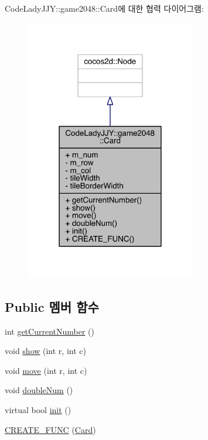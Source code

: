 Code\+Lady\+J\+JY\+:\+:game2048\+:\+:Card에 대한 협력 다이어그램\+:
\nopagebreak
\begin{figure}[H]
\begin{center}
\leavevmode
\includegraphics[width=210pt]{d7/d9b/class_code_lady_j_j_y_1_1game2048_1_1_card__coll__graph}
\end{center}
\end{figure}
\subsection*{Public 멤버 함수}
\begin{DoxyCompactItemize}
\item 
int \hyperlink{class_code_lady_j_j_y_1_1game2048_1_1_card_a7c8da9286db22bb16cfa0f8502b41eb4}{get\+Current\+Number} ()
\item 
void \hyperlink{class_code_lady_j_j_y_1_1game2048_1_1_card_abd3f3208867d1450ba4eeef3cef62d3f}{show} (int r, int c)
\item 
void \hyperlink{class_code_lady_j_j_y_1_1game2048_1_1_card_a6ad341b10626a9cc1aafe8229fa61ea6}{move} (int r, int c)
\item 
void \hyperlink{class_code_lady_j_j_y_1_1game2048_1_1_card_ad4cae75359815f3d80db488df3fd3dfd}{double\+Num} ()
\item 
virtual bool \hyperlink{class_code_lady_j_j_y_1_1game2048_1_1_card_a5efe85fbf1117b9a64cc13311352284c}{init} ()
\item 
\hyperlink{class_code_lady_j_j_y_1_1game2048_1_1_card_aeef08b192f5d93d6852ebfb75bb9bd9a}{C\+R\+E\+A\+T\+E\+\_\+\+F\+U\+NC} (\hyperlink{class_code_lady_j_j_y_1_1game2048_1_1_card}{Card})
\end{DoxyCompactItemize}

